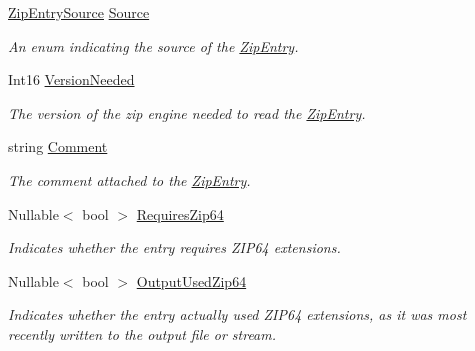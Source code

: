 \begin{DoxyCompactItemize}
\mbox{\hyperlink{namespace_super_tiled2_unity_1_1_ionic_1_1_zip_a9ced5352c56e7e0fceff15b534073c83}{Zip\+Entry\+Source}} \mbox{\hyperlink{class_super_tiled2_unity_1_1_ionic_1_1_zip_1_1_zip_entry_a9b8d8fe257d315d4407ad0ae81d98dde}{Source}}
\begin{DoxyCompactList}\small\item\em An enum indicating the source of the \mbox{\hyperlink{class_super_tiled2_unity_1_1_ionic_1_1_zip_1_1_zip_entry}{Zip\+Entry}}. \end{DoxyCompactList}\item 
Int16 \mbox{\hyperlink{class_super_tiled2_unity_1_1_ionic_1_1_zip_1_1_zip_entry_a20cc898535b0cc01abc025d4678050be}{Version\+Needed}}
\begin{DoxyCompactList}\small\item\em The version of the zip engine needed to read the \mbox{\hyperlink{class_super_tiled2_unity_1_1_ionic_1_1_zip_1_1_zip_entry}{Zip\+Entry}}. \end{DoxyCompactList}\item 
string \mbox{\hyperlink{class_super_tiled2_unity_1_1_ionic_1_1_zip_1_1_zip_entry_a59ecd22f231ce6c16aec38e12a90bd6a}{Comment}}
\begin{DoxyCompactList}\small\item\em The comment attached to the \mbox{\hyperlink{class_super_tiled2_unity_1_1_ionic_1_1_zip_1_1_zip_entry}{Zip\+Entry}}. \end{DoxyCompactList}\item 
Nullable$<$ bool $>$ \mbox{\hyperlink{class_super_tiled2_unity_1_1_ionic_1_1_zip_1_1_zip_entry_ac89b4cc0aff95adfa926c3649042d539}{Requires\+Zip64}}
\begin{DoxyCompactList}\small\item\em Indicates whether the entry requires Z\+I\+P64 extensions. \end{DoxyCompactList}\item 
Nullable$<$ bool $>$ \mbox{\hyperlink{class_super_tiled2_unity_1_1_ionic_1_1_zip_1_1_zip_entry_a1e1ef842a3e02644daeffa985f14ac11}{Output\+Used\+Zip64}}
\begin{DoxyCompactList}\small\item\em Indicates whether the entry actually used Z\+I\+P64 extensions, as it was most recently written to the output file or stream. \end{DoxyCompactList}\item 

\end{DoxyCompactItemize}
